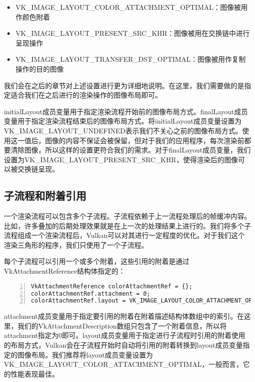 \documentclass{ctexart}
\begin{document}
\begin{itemize}
	\item VK\_IMAGE\_LAYOUT\_COLOR\_ATTACHMENT\_OPTIMAL：图像被用作颜色附着
	\item VK\_IMAGE\_LAYOUT\_PRESENT\_SRC\_KHR：图像被用在交换链中进行呈现操作
	\item VK\_IMAGE\_LAYOUT\_TRANSFER\_DST\_OPTIMAL：图像被用作复制操作的目的图像
\end{itemize}

我们会在之后的章节对上述设置进行更为详细地说明。在这里，我们需要做的是指定适合我们在之后进行的渲染操作的图像布局即可。

initialLayout成员变量用于指定渲染流程开始前的图像布局方式。finalLayout成员变量用于指定渲染流程结束后的图像布局方式。将initialLayout成员变量设置为VK\_IMAGE\_LAYOUT\_UNDEFINED表示我们不关心之前的图像布局方式。使用这一值后，图像的内容不保证会被保留，但对于我们的应用程序，每次渲染前都要清除图像，所以这样的设置更符合我们的需求。对于finalLayout成员变量，我们设置为VK\_IMAGE\_LAYOUT\_PRESENT\_SRC\_KHR，使得渲染后的图像可以被交换链呈现。

\subsection{子流程和附着引用}

一个渲染流程可以包含多个子流程。子流程依赖于上一流程处理后的帧缓冲内容。比如，许多叠加的后期处理效果就是在上一次的处理结果上进行的。我们将多个子流程组成一个渲染流程后，Vulkan可以对其进行一定程度的优化。对于我们这个渲染三角形的程序，我们只使用了一个子流程。

每个子流程可以引用一个或多个附着，这些引用的附着是通过VkAttachmentReference结构体指定的：

\begin{lstlisting}[language={[ANSI]C},keywordstyle=\color{blue!70},commentstyle=\color{red!50!green!50!blue!50},frame=shadowbox, rulesepcolor=\color{red!20!green!20!blue!20},basicstyle=\small,numbers=left, numberstyle=\tiny,breaklines=true]
VkAttachmentReference colorAttachmentRef = {};
colorAttachmentRef.attachment = 0;
colorAttachmentRef.layout = VK_IMAGE_LAYOUT_COLOR_ATTACHMENT_OPTIMAL;
\end{lstlisting}

attachment成员变量用于指定要引用的附着在附着描述结构体数组中的索引。在这里，我们的VkAttachmentDescription数组只包含了一个附着信息，所以将attachment指定为0即可。layout成员变量用于指定进行子流程时引用的附着使用的布局方式，Vulkan会在子流程开始时自动将引用的附着转换到layout成员变量指定的图像布局。我们推荐将layout成员变量设置为VK\_IMAGE\_LAYOUT\_COLOR\_ATTACHMENT\_OPTIMAL，一般而言，它的性能表现最佳。
\end{document}
